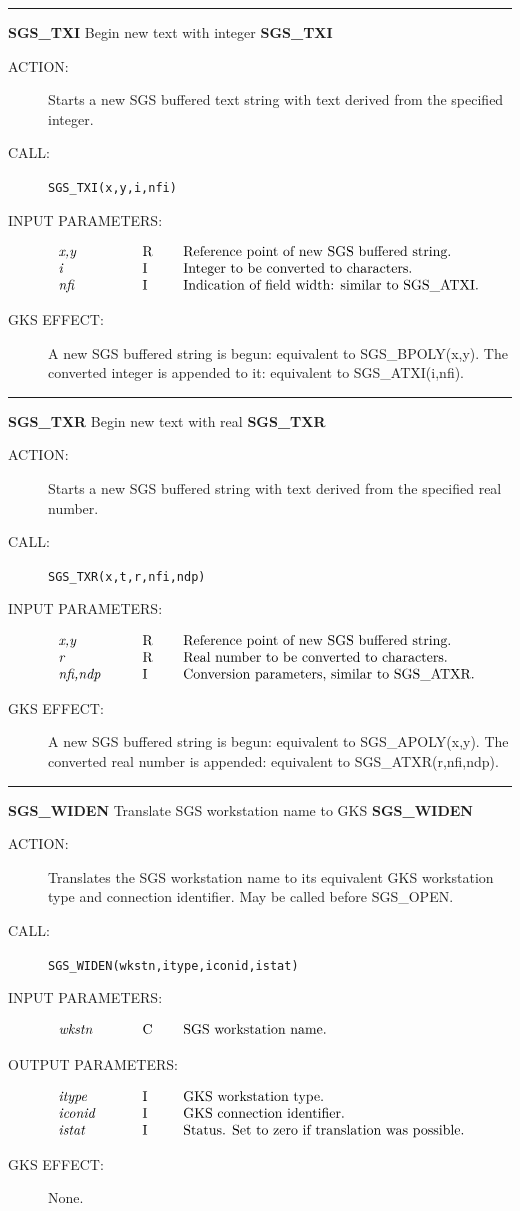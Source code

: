 \documentclass[11pt]{article}
\newcommand{\htmlref}[2]{#1}
\newcommand{\xlabel}[1]{}
\newcommand{\rthead}[2]{\rule{\textwidth}{0.3mm}
{\Large {\bf #1} \hfill #2 \hfill {\bf #1}}}
\newenvironment{params}%
{\[\begin{tabular}{p{0.14\textwidth}p{0.05\textwidth}p{0.66\textwidth}}}%
{\end{tabular}\]}
\newcommand{\rparams}[3]{{\em #1} &#2 &#3\\}
\newcommand{\rthead}[2]{\subsection{\label{#1}\xlabel{#1}#1 - #2}}
\newenvironment{params}{\begin{description}}{\end{description}}
\newcommand{\rparams}[3]{\item{{\em #1}} (#2) #3}
\begin{document}
\rthead{SGS\_TXI}{Begin new text with integer}
\begin{description}
\item [ACTION:]
Starts a new SGS buffered text string with text derived from the specified
integer.
\item [CALL:]
{\tt SGS\_TXI(x,y,i,nfi)}
\item [INPUT PARAMETERS:]
\begin{params}
\rparams{x,y}{R}{Reference point of new SGS buffered string.}
\rparams{i}{I}{Integer to be converted to characters.}
\rparams{nfi}{I}{Indication of field width: similar to
\htmlref{SGS\_ATXI}{SGS_ATXT}.}
\end{params}
\item [GKS EFFECT:]
A new SGS buffered string is begun: equivalent to
\htmlref{SGS\_BPOLY}{SGS_BPOLY}(x,y).
The converted integer is appended to it: equivalent to
\htmlref{SGS\_ATXI}{SGS_ATXI}(i,nfi).
\end{description}
\goodbreak

\rthead{SGS\_TXR}{Begin new text with real}
\begin{description}
\item [ACTION:]
Starts a new SGS buffered string with text derived from the specified real
number.
\item [CALL:]
{\tt SGS\_TXR(x,t,r,nfi,ndp)}
\item [INPUT PARAMETERS:]
\begin{params}
\rparams{x,y}{R}{Reference point of new SGS buffered string.}
\rparams{r}{R}{Real number to be converted to characters.}
\rparams{nfi,ndp}{I}{Conversion parameters, similar to
\htmlref{SGS\_ATXR}{SGS_ATXR}.}
\end{params}
\item [GKS EFFECT:]
A new SGS buffered string is begun: equivalent to
\htmlref{SGS\_APOLY}{SGS_APOLY}(x,y).
The converted real number is appended: equivalent to
\htmlref{SGS\_ATXR}{SGS_ATXR}(r,nfi,ndp).
\end{description}
\goodbreak

\rthead{SGS\_WIDEN}{Translate SGS workstation name to GKS}
\begin{description}
\item [ACTION:]
Translates the SGS workstation name to its equivalent GKS workstation type
and connection identifier.
May be called before SGS\_OPEN.
\item [CALL:]
{\tt SGS\_WIDEN(wkstn,itype,iconid,istat)}
\item [INPUT PARAMETERS:]
\begin{params}
\rparams{wkstn}{C}{SGS workstation name.}
\end{params}
\item [OUTPUT PARAMETERS:]
\begin{params}
\rparams{itype}{I}{GKS workstation type.}
\rparams{iconid}{I}{GKS connection identifier.}
\rparams{istat}{I}{Status. Set to zero if translation was possible.}
\end{params}
\item [GKS EFFECT:]
None.
\end{description}
\goodbreak
\end{document}
